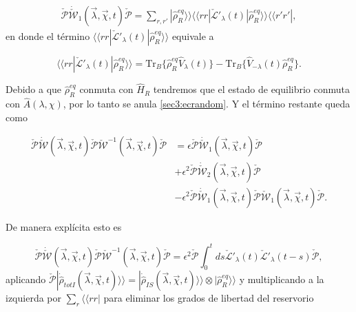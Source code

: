 \begin{appendixs}
\begin{align*}
    \check{\mathcal{P}}\dot{\check{\mathcal{W}}}_{1}(\vec{\lambda},\vec{\chi},t)\check{\mathcal{P}} = \sum_{r,r'}|\hat{\rho}^{eq}_{R} \rangle \rangle \langle \langle rr| \check{\mathcal{L}}'_{\lambda}(t)|\hat{\rho}_{R}^{eq}\rangle \rangle \langle \langle r'r'|,
\end{align*}
en donde el término $\langle \langle rr|\check{\mathcal{L}}'_{\lambda}(t)|\hat{\rho}_{R}^{eq}\rangle \rangle$ equivale a 

\begin{equation}
    \langle \langle rr|\check{\mathcal{L}}'_{\lambda}(t)|\hat{\rho}_{R}^{eq}\rangle \rangle  = \text{Tr}_{B}\{\hat{\rho}^{eq}_{R}\hat{V}_{\lambda}(t)\} - \text{Tr}_{B}\{\hat{V}_{-\lambda}(t)\hat{\rho}^{eq}_{R}\}.
    \label{sec3:ecrandom}
\end{equation}

Debido a que $\hat{\rho}^{eq}_{R}$ conmuta con $\hat{H}_{R}$ tendremos que el estado de equilibrio conmuta con $\hat{A}(\lambda,\chi)$, por lo tanto se anula \ref{sec3:ecrandom}. Y el término restante queda como 

\begin{align*}
    \check{\mathcal{P}}\dot{\check{\mathcal{W}}}(\vec{\lambda},\vec{\chi},t)\check{\mathcal{P}}\check{\mathcal{W}}^{-1}(\vec{\lambda},\vec{\chi},t)\check{\mathcal{P}} & = \epsilon \check{\mathcal{P}}\dot{\check{\mathcal{W}}}_{1}(\vec{\lambda},\vec{\chi},t)\check{\mathcal{P}} \\
    & + \epsilon^{2}\check{\mathcal{P}}\dot{\check{\mathcal{W}}}_{2}(\vec{\lambda},\vec{\chi},t)\check{\mathcal{P}} \\
    & - \epsilon^{2}\check{\mathcal{P}}\dot{\check{\mathcal{W}}}_{1}(\vec{\lambda},\vec{\chi},t)\check{\mathcal{P}}  \check{\mathcal{W}}_{1}(\vec{\lambda},\vec{\chi},t) \check{\mathcal{P}}.
\end{align*}

De manera explícita esto es

\begin{equation*}
    \check{\mathcal{P}}\dot{\check{\mathcal{W}}}(\vec{\lambda},\vec{\chi},t)\check{\mathcal{P}}\check{\mathcal{W}}^{-1}(\vec{\lambda},\vec{\chi},t)\check{\mathcal{P}} = \epsilon^{2}\check{\mathcal{P}}\int_{0}^{t}ds \check{\mathcal{L}}'_{\lambda}(t)\check{\mathcal{L}}'_{\lambda}(t-s)\check{\mathcal{P}}, 
\end{equation*}
aplicando $\check{\mathcal{P}}|\dot{\hat{\rho}}_{totI}(\vec{\lambda},\vec{\chi},t)\rangle \rangle = |\dot{\hat{\rho}}_{IS}(\vec{\lambda},\vec{\chi},t)\rangle \rangle \otimes |\hat{\rho}^{eq}_{R}\rangle \rangle$ y multiplicando a la izquierda por $\sum_{r}\langle \langle rr|$ para eliminar los grados de libertad del reservorio


\end{appendixs}
